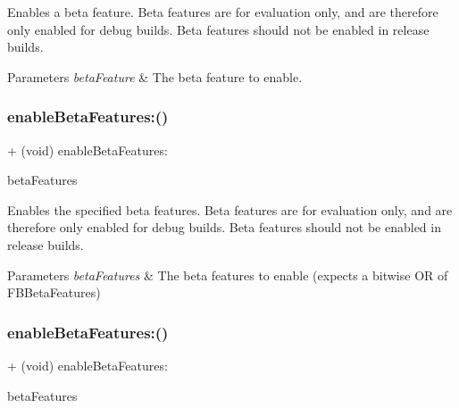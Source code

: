 Enables a beta feature. Beta features are for evaluation only, and are therefore only enabled for debug builds. Beta features should not be enabled in release builds.


\begin{DoxyParams}{Parameters}
{\em beta\+Feature} & The beta feature to enable. \\
\hline
\end{DoxyParams}
\mbox{\label{interfaceFBSettings_a9ce6bc977fc54c59ba5cacf56922ccac}} 
\subsubsection{\texorpdfstring{enable\+Beta\+Features\+:()}{enableBetaFeatures:()}\hspace{0.1cm}{\footnotesize\ttfamily [1/5]}}
{\footnotesize\ttfamily + (void) enable\+Beta\+Features\+: \begin{DoxyParamCaption}\item[{(N\+S\+U\+Integer)}]{beta\+Features }\end{DoxyParamCaption}}

Enables the specified beta features. Beta features are for evaluation only, and are therefore only enabled for debug builds. Beta features should not be enabled in release builds.


\begin{DoxyParams}{Parameters}
{\em beta\+Features} & The beta features to enable (expects a bitwise OR of F\+B\+Beta\+Features) \\
\hline
\end{DoxyParams}
\mbox{\label{interfaceFBSettings_a9ce6bc977fc54c59ba5cacf56922ccac}} 
\subsubsection{\texorpdfstring{enable\+Beta\+Features\+:()}{enableBetaFeatures:()}\hspace{0.1cm}{\footnotesize\ttfamily [2/5]}}
{\footnotesize\ttfamily + (void) enable\+Beta\+Features\+: \begin{DoxyParamCaption}\item[{(N\+S\+U\+Integer)}]{beta\+Features }\end{DoxyParamCaption}}

